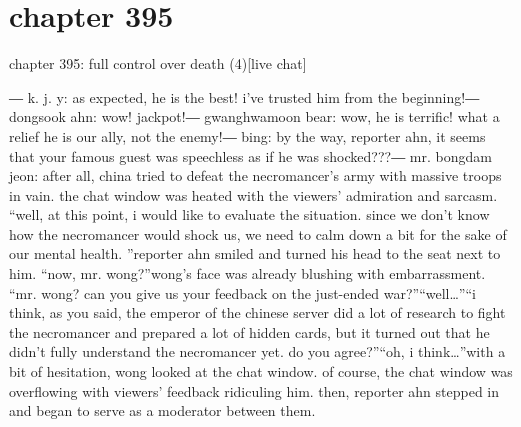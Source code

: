 \section{chapter 395}

chapter 395: full control over death (4)[live chat]




― k.
j.
y: as expected, he is the best! i’ve trusted him from the beginning!― dongsook ahn: wow! jackpot!― gwanghwamoon bear: wow, he is terrific! what a relief he is our ally, not the enemy!― bing: by the way, reporter ahn, it seems that your famous guest was speechless as if he was shocked???― mr.
 bongdam jeon: after all, china tried to defeat the necromancer’s army with massive troops in vain.
the chat window was heated with the viewers’ admiration and sarcasm.
“well, at this point, i would like to evaluate the situation.
 since we don’t know how the necromancer would shock us, we need to calm down a bit for the sake of our mental health.
”reporter ahn smiled and turned his head to the seat next to him.
“now, mr.
 wong?”wong’s face was already blushing with embarrassment.
“mr.
 wong? can you give us your feedback on the just-ended war?”“well…”“i think, as you said, the emperor of the chinese server did a lot of research to fight the necromancer and prepared a lot of hidden cards, but it turned out that he didn’t fully understand the necromancer yet.
 do you agree?”“oh, i think…”with a bit of hesitation, wong looked at the chat window.
 of course, the chat window was overflowing with viewers’ feedback ridiculing him.
then, reporter ahn stepped in and began to serve as a moderator between them.

